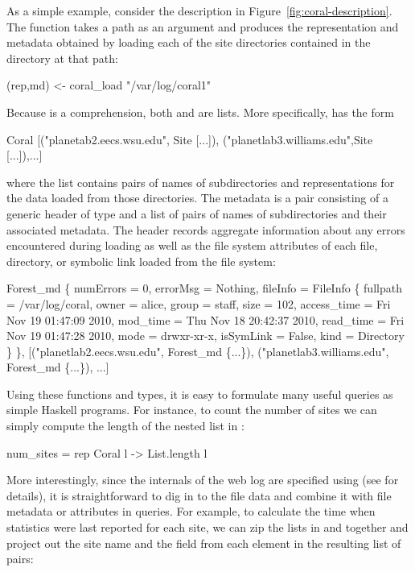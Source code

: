 As a simple example, consider the  description in
Figure~\ref{fig:coral-description}. The  function takes
a path as an argument and produces the representation and metadata
obtained by loading each of the site directories contained in the
directory at that path:
%
\begin{code}
(rep,md) <- coral_load "/var/log/coral1"
\end{code}
Because  is a comprehension, both  and  are
lists. More specifically,  has the form
\begin{code}
Coral [("planetab2.eecs.wsu.edu", Site [...]),
       ("planetlab3.williams.edu",Site [...]),...]
\end{code}
where the list contains pairs of names of subdirectories and
representations for the data loaded from those directories. The
metadata is a pair consisting of a generic header of type
 and a list of pairs of names of subdirectories and
their associated metadata. The header records aggregate information
about any errors encountered during loading as well as the file system
attributes of each file, directory, or symbolic link loaded from the
file system:
%
\begin{code}
Forest_md 
  \{ numErrors = 0, 
    errorMsg = Nothing, 
    fileInfo = FileInfo
      \{ fullpath = /var/log/coral, 
        owner = alice, group = staff, size = 102, 
        access_time = Fri Nov 19 01:47:09 2010, 
        mod_time = Thu Nov 18 20:42:37 2010, 
        read_time = Fri Nov 19 01:47:28 2010, 
        mode = drwxr-xr-x, isSymLink = False, 
        kind = Directory \} \},
[("planetlab2.eecs.wsu.edu", Forest_md \{...\}),
 ("planetlab3.williams.edu", Forest_md \{...\}), ...]
\end{code}
%
Using these functions and types, it is easy to formulate many useful
queries as simple Haskell programs. For instance, to count the number
of sites we can simply compute the length of the nested list in
:
%
\begin{code}
num_sites =  rep  Coral l -> List.length l 
\end{code}
%
More interestingly, since the internals of the web log are
specified using \padshaskell{} (see \auxmaterials{} for details), 
it is straightforward to
dig in to the file data and combine it with file metadata
or attributes in queries.  For example,
to calculate the time when statistics were last
reported for each site, we can zip the lists in  and 
together and project out the site name and the  field
from each element in the resulting list of pairs:
%

